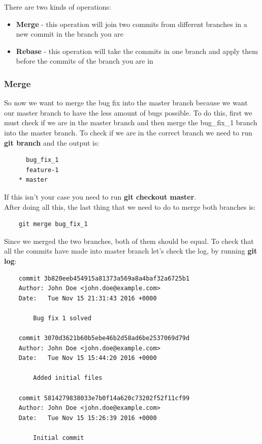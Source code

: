 \documentclass{article}
\begin{document}
There are two kinds of operations: 

\begin{itemize}
	\item{\textbf{Merge} - this operation will join two commits from different branches in a new commit in the branch you are}
	\item{\textbf{Rebase} - this operation will take the commits in one branch and apply them before the commits of the branch you are in}
\end{itemize}

\subsubsection{Merge}

So now we want to merge the bug fix into the master branch because we want our master branch to have the less amount of bugs possible. To do this, first we must check if we are in the master branch and then merge the bug\_fix\_1 branch into the master branch. To check if we are in the correct branch we need to run \textbf{git branch} and the output is:

\begin{lstlisting}
	  bug_fix_1
	  feature-1
	* master
\end{lstlisting}

If this isn't your case you need to run \textbf{git checkout master}.\\

After doing all this, the last thing that we need to do to merge both branches is:

\begin{lstlisting}
	git merge bug_fix_1
\end{lstlisting}

Since we merged the two branches, both of them should be equal. To check that all the commits have made into master branch let's check the log, by running \textbf{git log}:

\begin{lstlisting}
	commit 3b820eeb454915a81373a569a8a4baf32a6725b1
	Author: John Doe <john.doe@example.com>
	Date:   Tue Nov 15 21:31:43 2016 +0000

    	Bug fix 1 solved

	commit 3070d3621b60b5ebe46b2d58ad6be2537069d79d
	Author: John Doe <john.doe@example.com>
	Date:   Tue Nov 15 15:44:20 2016 +0000

    	Added initial files

	commit 5814279838033e7b0f14a620c73202f52f11cf99
	Author: John Doe <john.doe@example.com>
	Date:   Tue Nov 15 15:26:39 2016 +0000

    	Initial commit
\end{lstlisting}
\end{document}
